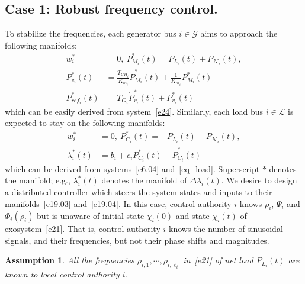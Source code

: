 \documentclass[journal]{IEEEtran}
\newcommand{\lbd}{{\lambda}}
\newcommand{\nnum}{\nonumber}
\newcommand{\GG}{{\mathcal{G}}}
\newcommand{\LL}{{\mathcal{L}}}
\newcommand{\NN}{{\mathcal{N}}}
\newtheorem{assumption}{\bf Assumption}[section]
\begin{document}
\subsection{Case 1: Robust frequency control.}\label{sec:formulation}
To stabilize the frequencies, each generator bus $i \in \GG$ aims to approach the following manifolds:
\begin{align}
w_i^* &= 0, \ P_{M_i}^*(t) = P_{L_i}(t)+P_{\NN_i}(t),\nnum\\
P_{v_i}^*(t) &=\frac{T_{{CH}_i}}{K_{m_i}} \dot{P}_{M_i}^*(t) + \frac{1}{K_{m_i}}P_{M_i}^*(t)\nnum\\
P_{{ref}_i}^*(t) &= T_{G_i} \dot{P}_{v_i}^*(t) + P_{v_i}^*(t)
\label{e19.03}
\end{align}
which can be easily derived from system~\eqref{e24}.
Similarly, each load bus $i \in \LL$ is expected to stay on the following manifolds:
\begin{align}
w_i^* &= 0, \ P_{C_i}^*(t) = -P_{L_i}(t)-P_{\NN_i}(t),\nnum\\
\lbd_i^*(t) &= b_i + c_i P_{C_i}^*(t) - \dot{P}_{C_i}^*(t)
\label{e19.04}
\end{align}
which can be derived from systems~\eqref{e6.04} and~\eqref{eq_load}.
Superscript $*$ denotes the manifold; e.g., $\lambda_i^*(t)$ denotes the manifold of $\Delta \lambda_i(t)$.
We desire to design a distributed controller which steers the system states and inputs to their manifolds~\eqref{e19.03} and~\eqref{e19.04}.
In this case, 
control authority $i$ knows $\rho_i$, $\Psi_i$ and $\Phi_i(\rho_i)$ but is unaware of initial state $\chi_i(0)$ and state $\chi_i(t)$ of exosystem~\eqref{e21}. That is, control authority $i$ knows the number of sinusoidal signals, and their frequencies, but not their phase shifts and magnitudes.
\begin{assumption}
All the frequencies $\rho_{i,1}, \cdots, \rho_{i,\ell_i}$ in~\eqref{e21} of net load $P_{L_i}(t)$ are known to local control authority $i$.
\label{atsm1}
\end{assumption}
\end{document}

